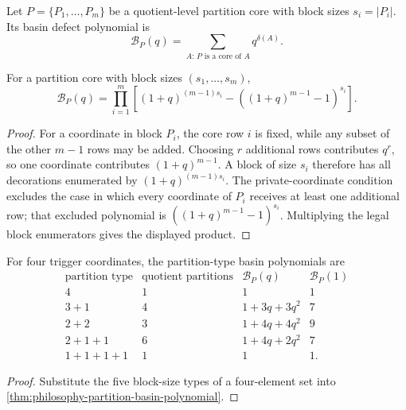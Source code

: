 \begin{definition}
\label{def:philosophy-partition-basin-defect-polynomial}
Let $P=\{P_{1},\ldots,P_{m}\}$ be a quotient-level partition core with
block sizes $s_{i}=|P_{i}|$. Its basin defect polynomial is
$$
  \mathcal{B}_{P}(q)
  =
  \sum_{A:\,P\text{ is a core of }A}q^{\delta(A)}.
$$
\end{definition}

\begin{theorem}
\label{thm:philosophy-partition-basin-polynomial}
For a partition core with block sizes $(s_{1},\ldots,s_{m})$,
$$
  \mathcal{B}_{P}(q)
  =
  \prod_{i=1}^{m}
  \left[
    (1+q)^{(m-1)s_{i}}
    -
    \left((1+q)^{m-1}-1\right)^{s_{i}}
  \right].
$$
\end{theorem}
\begin{proof}
For a coordinate in block $P_{i}$, the core row $i$ is fixed, while any
subset of the other $m-1$ rows may be added. Choosing $r$ additional
rows contributes $q^{r}$, so one coordinate contributes
$(1+q)^{m-1}$. A block of size $s_{i}$ therefore has all decorations
enumerated by $(1+q)^{(m-1)s_{i}}$. The private-coordinate condition
excludes the case in which every coordinate of $P_{i}$ receives at
least one additional row; that excluded polynomial is
$((1+q)^{m-1}-1)^{s_{i}}$. Multiplying the legal block enumerators gives
the displayed product.
\end{proof}

\begin{corollary}
\label{cor:philosophy-four-coordinate-basin-polynomials}
For four trigger coordinates, the partition-type basin polynomials are
$$
\begin{array}{c|r|c|r}
  \text{partition type} & \text{quotient partitions} & \mathcal{B}_{P}(q) & \mathcal{B}_{P}(1)\\
  \hline
  4 & 1 & 1 & 1\\
  3+1 & 4 & 1+3q+3q^{2} & 7\\
  2+2 & 3 & 1+4q+4q^{2} & 9\\
  2+1+1 & 6 & 1+4q+2q^{2} & 7\\
  1+1+1+1 & 1 & 1 & 1.
\end{array}
$$
\end{corollary}
\begin{proof}
Substitute the five block-size types of a four-element set into
\autoref{thm:philosophy-partition-basin-polynomial}.
\end{proof}

